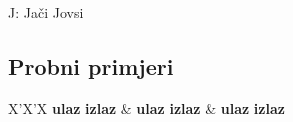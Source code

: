 \begin{statement}[
  timelimit=1 s,
  memorylimit=512 MiB,
]{J: Jači Jovsi}
\subsection*{Probni primjeri}
\begin{tabularx}{\textwidth}{X'X'X}
  \textbf{ulaz}
  \linespread{1}{}
  \textbf{izlaz}
  \linespread{1}{} &
  \textbf{ulaz}
  \linespread{1}{}
  \textbf{izlaz}
  \linespread{1}{} &
  \textbf{ulaz}
  \linespread{1}{}
  \textbf{izlaz}
  \linespread{1}{}
\end{tabularx}

\end{statement}

